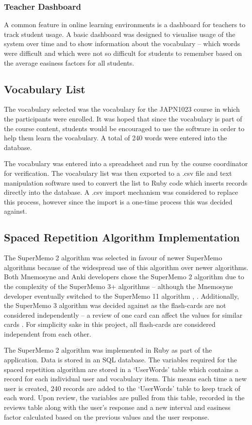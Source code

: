 \subsubsection{Teacher Dashboard}
A common feature in online learning environments is a dashboard for teachers to track
student usage. A basic dashboard was designed to visualise usage of the system
over time and to show information about the vocabulary -- which words were difficult
and which were not so difficult for students to remember based on the average easiness
factors for all students.

\subsection{Vocabulary List}
The vocabulary selected was the vocabulary for the JAPN1023 course in which the participants
were enrolled. It was hoped that since the vocabulary is part of the course content, students
would be encouraged to use the software in order to help them learn the vocabulary. A total of 240 words were
entered into the database. 

The vocabulary was entered into a spreadsheet and run by the course coordinator for verification.
The vocabulary list was then exported to a .csv file and text manipulation software
used to convert the list to Ruby code which inserts records directly into the
database. A .csv import mechanism was considered to replace this process, however
since the import is a one-time process this was decided against.  

\subsection{Spaced Repetition Algorithm Implementation}
The SuperMemo 2 algorithm was selected in favour of newer SuperMemo algorithms because
of the widespread use of this algorithm over newer algorithms. Both Mnemosyne and Anki developers
chose the SuperMemo 2 algorithm due to the complexity of the SuperMemo 3+ algorithms -- although
the Mnemosyne developer eventually switched to the SuperMemo 11 algorithm
\cite{peter_bienstman_principles_2012}, \cite{anki_faq}. Additionally, the SuperMemo 3
algorithm was decided against as the flash-cards are not considered independently -- a review
of one card can affect the values for similar cards \cite{anki_faq}. For simplicity sake in this project, all
flash-cards are considered independent from each other.

The SuperMemo 2 algorithm was implemented in Ruby as part of the application.
Data is stored in an SQL database. The variables required for the spaced repetition
algorithm are stored in a `UserWords' table which contains a record for each individual
user and vocabulary item. This means each time a new user is created, 240 records are added to the
`UserWords' table to keep track of each word. Upon review, the variables are pulled from this
table, recorded in
the reviews table along with the user's response 
and a new interval and easiness factor calculated based on the previous
values and the user response.

